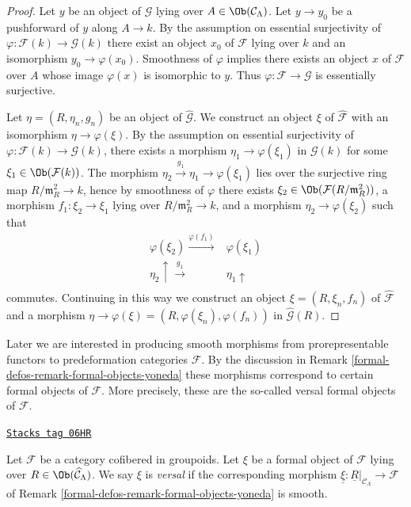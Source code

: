 \begin{proof}
Let $y$ be an object of $\mathcal{G}$ lying over
$A \in \Ob(\mathcal{C}_\Lambda)$. Let $y \to y_0$ be a pushforward
of $y$ along $A \to k$. By the assumption on essential surjectivity of
$\varphi : \mathcal{F}(k) \to \mathcal{G}(k)$ there exist an object
$x_0$ of $\mathcal{F}$ lying over $k$ and an isomorphism
$y_0 \to \varphi(x_0)$. Smoothness of $\varphi$ implies there exists
an object $x$ of $\mathcal{F}$ over $A$ whose image $\varphi(x)$
is isomorphic to $y$. Thus $\varphi : \mathcal{F} \to \mathcal{G}$
is essentially surjective.

\medskip\noindent
Let $\eta = (R, \eta_n, g_n)$ be an object of $\widehat{\mathcal{G}}$.  We
construct an object $\xi$ of $\widehat{\mathcal{F}}$ with an isomorphism
$\eta \to \varphi(\xi)$. By the assumption on essential surjectivity of
$\varphi : \mathcal{F}(k) \to \mathcal{G}(k)$, there exists a morphism
$\eta_1 \to \varphi(\xi_1)$ in $\mathcal{G}(k)$ for some
$\xi_1 \in \Ob(\mathcal{F}(k))$. The morphism
$\eta_2 \xrightarrow{g_1} \eta_1 \to \varphi(\xi_1)$
lies over the surjective ring map $R/\mathfrak m_R^2 \to k$, hence
by smoothness of $\varphi$ there exists
$\xi_2 \in \Ob(\mathcal{F}(R/\mathfrak m_R^2))$, a
morphism $f_1: \xi_2 \to \xi_1$ lying over
$R/\mathfrak m_R^2 \to k$, and a morphism
$\eta_2 \to \varphi(\xi_2)$ such that
$$
\begin{array}{cc}\varphi(\xi_2)  \overset{\varphi(f_1)}{\longrightarrow} & \varphi(\xi_{1}) \\ \eta_2   \uparrow\overset{g_1}{\longrightarrow} & \eta_1  \uparrow \\  & \end{array}
$$
commutes. Continuing in this way we construct an object
$\xi = (R, \xi_n, f_n)$ of $\widehat{\mathcal{F}}$ and a morphism
$\eta \to \varphi(\xi) = (R, \varphi(\xi_n), \varphi(f_n))$
in $\widehat{\mathcal{G}}(R)$.
\end{proof}

Later we are interested in producing smooth morphisms from
prorepresentable functors to predeformation categories $\mathcal{F}$.
By the discussion in
Remark \ref{formal-defos-remark-formal-objects-yoneda}
these morphisms correspond to certain formal objects of $\mathcal{F}$.
More precisely, these are the so-called versal formal objects of $\mathcal{F}$.

\begin{definition}[Versal]
\label{formal-defos-definition-versal}
\href{https://stacks.math.columbia.edu/tag/06HR}{\texttt{Stacks tag 06HR}}

Let $\mathcal{F}$ be a category cofibered in groupoids.  Let $\xi$ be a formal
object of $\mathcal{F}$ lying over $R \in \Ob(\widehat{\mathcal{C}}_\Lambda)$.
We say $\xi$ is {\it versal} if the corresponding morphism
$\underline{\xi}: \underline{R}|_{\mathcal{C}_\Lambda} \to \mathcal{F}$
of Remark \ref{formal-defos-remark-formal-objects-yoneda} is smooth.
\end{definition}

